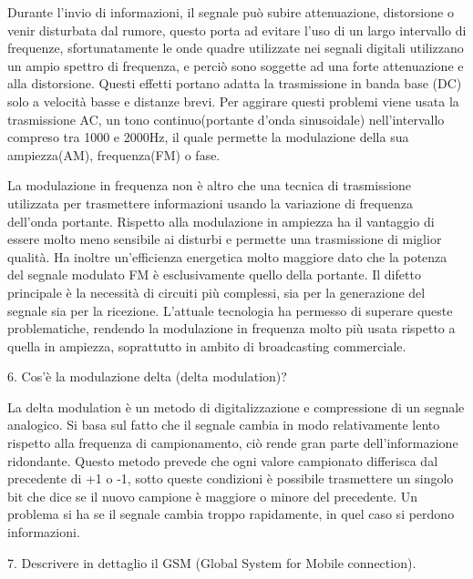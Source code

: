 Durante l’invio di informazioni, il segnale può subire attenuazione, distorsione o venir disturbata dal rumore, questo porta ad evitare l’uso di un largo intervallo di frequenze, sfortunatamente le onde quadre utilizzate nei segnali digitali utilizzano un ampio spettro di frequenza, e perciò sono soggette ad una forte attenuazione e alla distorsione.
Questi effetti portano adatta la trasmissione in banda base (DC) solo a velocità basse e distanze brevi.
Per aggirare questi problemi viene usata la trasmissione AC, un tono continuo(portante d’onda sinusoidale) nell’intervallo compreso tra 1000 e 2000Hz, il quale permette la modulazione della sua ampiezza(AM), frequenza(FM) o fase.
 
La modulazione in frequenza non è altro che una tecnica di trasmissione utilizzata per trasmettere informazioni usando la variazione di frequenza dell’onda portante. Rispetto alla modulazione in ampiezza ha il vantaggio di essere molto meno sensibile ai disturbi e permette una trasmissione di miglior qualità. Ha inoltre un’efficienza energetica molto maggiore dato che la potenza del segnale modulato FM è esclusivamente quello della portante.
Il difetto principale è la necessità di circuiti più complessi, sia per la generazione del segnale sia per la ricezione. L’attuale tecnologia ha permesso di superare queste problematiche, rendendo la modulazione in frequenza molto più usata rispetto a quella in ampiezza, soprattutto in ambito di broadcasting commerciale.

6.	Cos’è la modulazione delta (delta modulation)?

La delta modulation è un metodo di digitalizzazione e compressione di un segnale analogico.
Si basa sul fatto che il segnale cambia in modo relativamente lento rispetto alla frequenza di campionamento, ciò rende gran parte dell’informazione ridondante.
Questo metodo prevede che ogni valore campionato differisca dal precedente di +1 o -1, sotto queste condizioni è possibile trasmettere un singolo bit che dice se il nuovo campione è maggiore o minore del precedente.
Un problema si ha se il segnale cambia troppo rapidamente, in quel caso si perdono informazioni.
 
7.	Descrivere in dettaglio il GSM (Global System for Mobile connection).

